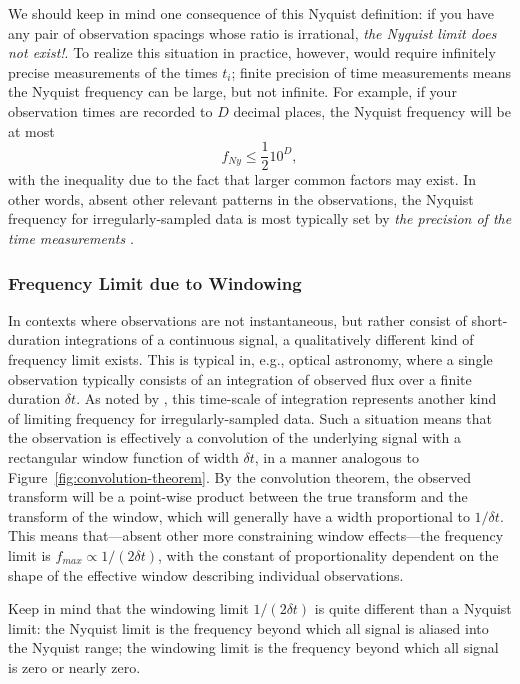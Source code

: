 \documentclass[preprint]{aastex}
\newcommand{\fig}[1]{Figure~\ref{fig:#1}}
\newcommand{\eqlabel}[1]{\label{eq:#1}}
\begin{document}
We should keep in mind one consequence of this Nyquist definition:
if you have any pair of observation spacings
whose ratio is irrational, {\it the Nyquist limit does not exist!}.
To realize this situation in practice, however, 
would require infinitely precise measurements of the
times $t_i$; finite precision of time measurements means the Nyquist
frequency can be large, but not infinite.
For example, if your observation times are recorded to $D$ decimal places,
the Nyquist frequency will be at most
\begin{equation}
  f_{Ny} \le \frac{1}{2} 10^D,
  \eqlabel{nonuniform-nyquist}
\end{equation}
with the inequality due to the fact that larger common factors may exist.
In other words, absent other relevant patterns in the observations,
the Nyquist frequency for irregularly-sampled data is most
typically set by {\it the precision of the time measurements}
\citep[see][for more rigorous treatments
  of this result]{Bretthorst2003, Koen2006}.

\subsubsection{Frequency Limit due to Windowing}

In contexts where observations are not instantaneous, but rather consist of
short-duration integrations of a continuous signal, a qualitatively different
kind of frequency limit exists.
This is typical in, e.g., optical astronomy, where a single observation typically consists of an integration of observed flux over a finite duration $\delta t$.
As noted by \citet{ICVG2014}, this time-scale of integration represents another
kind of limiting frequency for irregularly-sampled data.
Such a situation means that the observation is effectively a convolution of
the underlying signal with a rectangular window function of width $\delta t$,
in a manner analogous to \fig{convolution-theorem}.
By the convolution theorem, the observed transform will be a point-wise
product between the true transform and the transform of the window, which
will generally have a width proportional to $1/\delta t$.
This means that---absent other more constraining window effects---the
frequency limit is $f_{max} \propto 1/(2\delta t)$, with the constant of
proportionality dependent on the shape of the effective window describing
individual observations.

Keep in mind that the windowing limit $1/(2\delta t)$ is quite different than a
Nyquist limit: the Nyquist limit is the frequency beyond which all signal
is aliased into the Nyquist range; the windowing limit is the frequency
beyond which all signal is zero or nearly zero.
\end{document}
